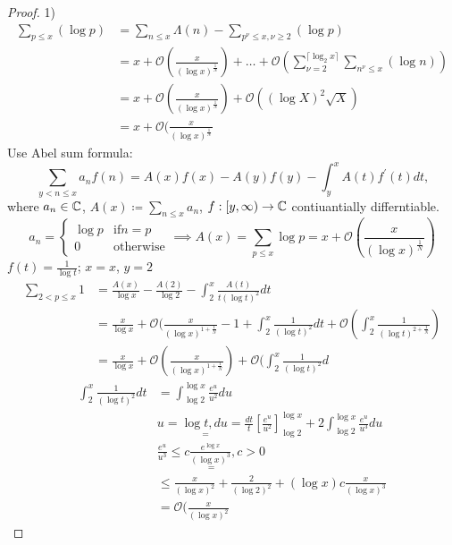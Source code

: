 \documentclass[NumTh.tex]{subfiles}
\begin{document}
\begin{proof}
  1) 
  \begin{align*}
    \sum_{p \leq x} (\log p) &= \sum_{n \leq x} \Lambda(n) - \sum_{p^\nu \leq x, \nu \geq 2} (\log p) \\
    &= x + \mathcal{O} ( \frac{x}{(\log x)^{\frac{1}{N}}}) + \dots + \mathcal{O}( \sum_{\nu = 2}^{\lceil \log_2 x \rceil} \sum_{n^\nu \leq x} (\log n)) \\
    &= x + \mathcal{O}(\frac{x}{(\log x)^{\frac{1}{N}}}) + \mathcal{O} ( (\log X)^2 \sqrt{X}) \\
    &= x + \mathcal{O}( \frac{x}{(\log x)^{\frac{1}{N}}} 
  \end{align*}
  Use Abel sum formula:
  \[ \sum_{y < n \leq x} a_n f(n) = A(x) f(x) - A(y) f(y) - \int_y^x A(t) f^\prime(t) dt \text{,} \]
  where $a_n \in \mathbb{C}$, $A(x) \coloneq \sum_{n \leq x} a_n$, $f: [y,\infty) \to \mathbb{C}$ contiuantially differntiable.
  \[ a_n =
  \begin{cases}
    \log p & \text{if} n = p \\
    0 & \text{otherwise}
  \end{cases}
  \implies A(x) = \sum_{p \leq x} \log p = x + \mathcal{O}(\frac{x}{(\log x)^{\frac{1}{N}}}) \]
  $f(t) = \frac{1}{\log t}$;
  $x = x$, $y = 2$
  \begin{align*}
    \sum_{2 < p \leq x} 1 &= \frac{A(x)}{\log x} - \frac{A(2)}{\log 2} - \int_2^x \frac{A(t)}{t (\log t)^2} dt \\
    &= \frac{x}{\log x} + \mathcal{O}(\frac{x}{(\log x)^{1+\frac{1}{N}}} - 1 + \int_2^x \frac{1}{(\log t)^2} dt
  + \mathcal{O} ( \int_2^x \frac{1}{(\log t)^{2+\frac{1}{N}}}) \\
    &= \frac{x}{\log x} + \mathcal{O}( \frac{x}{(\log x)^{1 + \frac{1}{N}}}) + \mathcal{O}( \int_2^x \frac{1}{(\log t)^2}d 
  \end{align*}
  \begin{align*}
    \int_2^x \frac{1}{(\log t)^2} dt &= \int_{\log 2}^{\log x} \frac{e^u}{u^2} du \\
  &\underset{=}{u = \log t, du = \frac{dt}{t}} [ \frac{e^u}{u^2}]_{\log 2}^{\log x} + 2 \int_{\log 2}^{\log x} \frac{e^u}{u^3} du \\
  &\underset{=}{ \frac{e^u}{u^3} \leq c \frac{e^{\log x}}{(\log x)^3}, c > 0} \\
  &\leq \frac{x}{(\log x)^2} + \frac{2}{(\log 2)^2} + (\log x)c \frac{x}{(\log x)^3} \\
  &= \mathcal{O}(\frac{x}{(\log x)^2} 
  \end{align*}
\end{proof}
\end{document}
